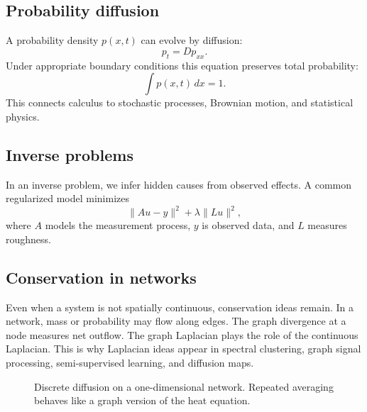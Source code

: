 \documentclass[11pt]{article}
\begin{document}
\subsection*{Probability diffusion}
A probability density $p(x,t)$ can evolve by diffusion:
\[
p_t=Dp_{xx}.
\]
Under appropriate boundary conditions this equation preserves total probability:
\[
\int p(x,t)\,dx=1.
\]
This connects calculus to stochastic processes, Brownian motion, and statistical physics.

\subsection*{Inverse problems}
In an inverse problem, we infer hidden causes from observed effects. A common regularized model minimizes
\[
\|Au-y\|^2+\lambda\|Lu\|^2,
\]
where $A$ models the measurement process, $y$ is observed data, and $L$ measures roughness.

\subsection*{Conservation in networks}
Even when a system is not spatially continuous, conservation ideas remain. In a network, mass or probability may flow along edges. The graph divergence at a node measures net outflow. The graph Laplacian plays the role of the continuous Laplacian. This is why Laplacian ideas appear in spectral clustering, graph signal processing, semi-supervised learning, and diffusion maps.

\begin{figure}[H]
\centering
{}
\caption{Discrete diffusion on a one-dimensional network. Repeated averaging behaves like a graph version of the heat equation.}
\end{figure}
\end{document}
